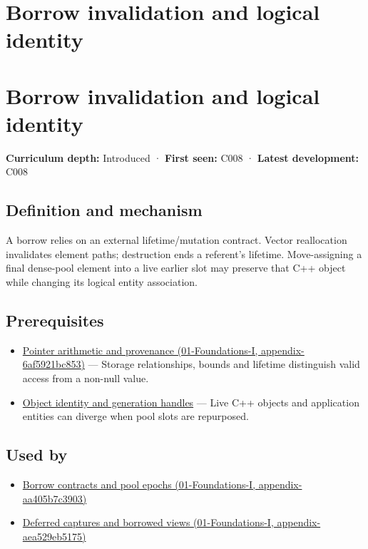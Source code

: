 \hypertarget{appendix-f9b8b9188c7f}{}
\section*{Borrow invalidation and logical identity}
\section{Borrow invalidation and logical identity}\label{appendix-f9b8b9188c7f-borrow-invalidation-and-logical-identity}

\textbf{Curriculum depth:} Introduced · \textbf{First seen:} C008 · \textbf{Latest development:} C008

\subsection{Definition and mechanism}\label{appendix-f9b8b9188c7f-definition-and-mechanism}

A borrow relies on an external lifetime/mutation contract. Vector reallocation invalidates element paths; destruction ends a referent's lifetime. Move-assigning a final dense-pool element into a live earlier slot may preserve that C++ object while changing its logical entity association.

\subsection{Prerequisites}\label{appendix-f9b8b9188c7f-prerequisites}

\begin{itemize}
\tightlist
\item
  \href{../01-Foundations-I/main.pdf\#nameddest=appendix-6af5921bc853}{Pointer arithmetic and provenance (01-Foundations-I, appendix-6af5921bc853)} --- Storage relationships, bounds and lifetime distinguish valid access from a non-null value.
\item
  \hyperref[appendix-f1581457d322]{Object identity and generation handles} --- Live C++ objects and application entities can diverge when pool slots are repurposed.
\end{itemize}

\subsection{Used by}\label{appendix-f9b8b9188c7f-used-by}

\begin{itemize}
\tightlist
\item
  \href{../01-Foundations-I/main.pdf\#nameddest=appendix-aa405b7c3903}{Borrow contracts and pool epochs (01-Foundations-I, appendix-aa405b7c3903)}
\item
  \href{../01-Foundations-I/main.pdf\#nameddest=appendix-aea529eb5175}{Deferred captures and borrowed views (01-Foundations-I, appendix-aea529eb5175)}
\end{itemize}

